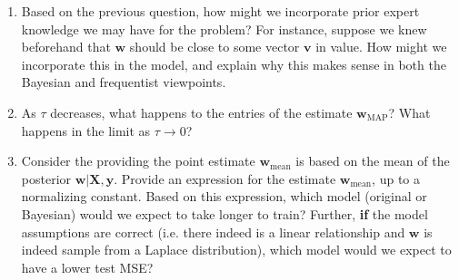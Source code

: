 \documentclass[submit]{harvardml}
\begin{document}
\begin{problem}
\begin{enumerate}
        \item Based on the previous question, how might we incorporate prior expert knowledge we may have for the problem? For instance, suppose we knew beforehand that $\mathbf{w}$ should be close to some vector $\mathbf{v}$ in value. How might we incorporate this in the model, and explain why this makes sense in both the Bayesian and frequentist viewpoints.
        
        \item As $\tau$ decreases, what happens to the entries of the estimate $\mathbf{w}_{\mathrm{MAP}}$? What happens in the limit as $\tau \to 0$?
        
        \item Consider the providing the point estimate $\mathbf{w}_{\mathrm{mean}}$ is based on the mean of the posterior $\mathbf{w}|\mathbf{X},\mathbf{y}$. Provide an expression for the estimate $\mathbf{w}_{\mathrm{mean}}$, up to a normalizing constant. Based on this expression, which model (original or Bayesian) would we expect to take longer to train? Further, \textbf{if} the model assumptions are correct (i.e. there indeed is a linear relationship and $\mathbf{w}$ is indeed sample from a Laplace distribution), which model would we expect to have a lower test MSE?
        
    \end{enumerate}
  
  
\end{problem}
\end{document}
